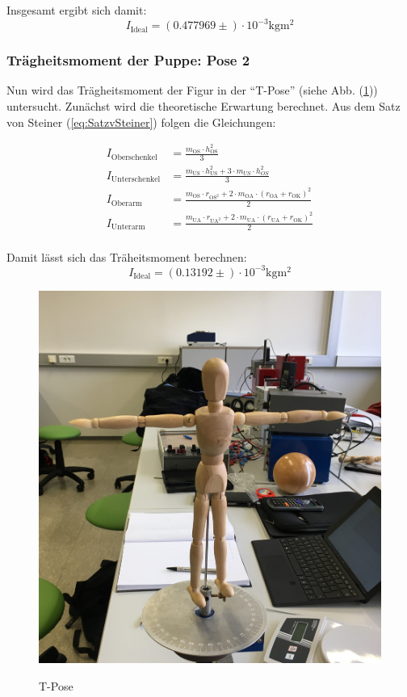 Insgesamt ergibt sich damit:
\begin{equation*}
  I_{\text{Ideal}} = (0.477969 \pm ) \cdot 10^{-3} \unit{\kilo\gram\meter\squared}
\end{equation*}

\subsubsection{Trägheitsmoment der Puppe: Pose 2}

Nun wird das Trägheitsmoment der Figur in der \enquote{T-Pose} (siehe Abb. (\ref{fig:pose2})) untersucht.
Zunächst wird die theoretische Erwartung berechnet.
Aus dem Satz von Steiner (\ref{eq:SatzvSteiner}) folgen die Gleichungen:

\begin{align*}
  I_{\text{Oberschenkel}} &= \frac{m_{\text{OS}} \cdot h_{\text{OS}}^2} {3} \\
  I_{\text{Unterschenkel}} &= \frac{m_{\text{US}} \cdot h_{\text{US}}^2 + 3 \cdot m_{US} \cdot h_{OS}^2} {3} \\
  I_{\text{Oberarm}} &= \frac{m_{\text{OS}} \cdot r_{\text{OS}^2} + 2 \cdot m_{\text{OA}} \cdot (r_{\text{OA}} + r_{\text{OK}})^2} {2} \\
  I_{\text{Unterarm}} &= \frac{m_{\text{UA}} \cdot r_{\text{UA}^2} + 2 \cdot m_{\text{UA}} \cdot (r_{\text{UA}} + r_{\text{OK}})^2} {2} \\
\end{align*}

Damit lässt sich das Träheitsmoment berechnen:
\begin{equation*}
  I_{\text{Ideal}} = (0.13192 \pm ) \cdot 10^{-3} \unit{\kilo\gram\meter\squared}
\end{equation*}

\begin{figure}[H]
  \caption{T-Pose}
  \centering
  \includegraphics[width=0.3\columnwidth]{pictures/puppe_tpose.jpg}
  \label{fig:pose2}
\end{figure}

